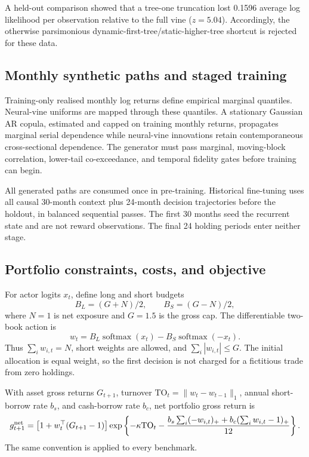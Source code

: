 A held-out comparison showed that a tree-one truncation lost 0.1596 average
log likelihood per observation relative to the full vine (\(z=5.04\)).
Accordingly, the otherwise parsimonious dynamic-first-tree/static-higher-tree
shortcut is rejected for these data.

\subsection{Monthly synthetic paths and staged training}

Training-only realised monthly log returns define empirical marginal
quantiles. Neural-vine uniforms are mapped through these quantiles. A
stationary Gaussian AR copula, estimated and capped on training monthly
returns, propagates marginal serial dependence while neural-vine innovations
retain contemporaneous cross-sectional dependence. The generator must pass
marginal, moving-block correlation, lower-tail co-exceedance, and temporal
fidelity gates before training can begin.

All generated paths are consumed once in pre-training. Historical
fine-tuning uses all causal 30-month context plus 24-month decision
trajectories before the holdout, in balanced sequential passes. The first
30 months seed the recurrent state and are not reward observations. The final
24 holding periods enter neither stage.

\subsection{Portfolio constraints, costs, and objective}

For actor logits \(x_t\), define long and short budgets
\[
 B_L=(G+N)/2,\qquad B_S=(G-N)/2,
\]
where \(N=1\) is net exposure and \(G=1.5\) is the gross cap. The differentiable
two-book action is
\[
 w_t=B_L\operatorname{softmax}(x_t)
     -B_S\operatorname{softmax}(-x_t).
\]
Thus \(\sum_i w_{i,t}=N\), short weights are allowed, and
\(\sum_i|w_{i,t}|\leq G\). The initial allocation is equal weight, so the first
decision is not charged for a fictitious trade from zero holdings.

With asset gross returns \(G_{t+1}\), turnover
\(\mathrm{TO}_t=\|w_t-w_{t-1}\|_1\), annual short-borrow rate \(b_s\), and
cash-borrow rate \(b_c\), net portfolio gross return is
\[
 g^{\rm net}_{t+1}=
 \left[1+w_t^\top(G_{t+1}-1)\right]
 \exp\left\{-\kappa\mathrm{TO}_t-
 \frac{b_s\sum_i(-w_{i,t})_+ + b_c(\sum_iw_{i,t}-1)_+}{12}\right\}.
\]
The same convention is applied to every benchmark.

